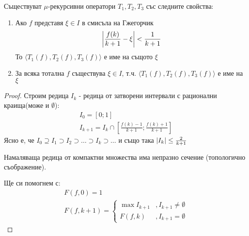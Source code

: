 \begin{lemma}[ретракция]
    Съществуват $\mu$-рекурсивни оператори $T_1, T_2, T_3$ със следните свойства:
    \begin{enumerate}
        \item Ако $f$ представя $\xi \in I$ в смисъла на Гжегорчик
        \begin{equation}
            \left|\frac{f(k)}{k+1} -\xi\right| < \frac{1}{k+1}
        \end{equation}
        То $\langle T_1(f), T_2(f), T_3(f)\rangle$ е име на същото $\xi$
        \item За всяка тотална $f$ съществува $\xi \in I$, т.ч. $\langle T_1(f), T_2(f), T_3(f)\rangle$ е име на $\xi$
    \end{enumerate}
\end{lemma}
\begin{proof}
    Строим редица $I_k$ - редица от затворени интервали с рационални краища(може и $\emptyset$):
    \begin{equation}
        \begin{split}
            I_0 = [0; 1] \\
            I_{k+1} = I_k \cap \left[ \frac{f(k)- 1}{k+1}; \frac{f(k) + 1}{k+1} \right]
        \end{split}
    \end{equation}
    Ясно е, че $I_0 \supseteq I_1 \supset I_2 \supset \dots \supset I_k \supset \dots$ и също така $\left|I_k\right| \leq \frac{2}{k+1}$

    Намаляваща редица от компактни множества има непразно сечение (топологично съображение).

    Ще си помогнем с:
    \begin{equation}
        \begin{split}
            F(f, 0) = 1\\
            F(f, k+1) = \begin{cases}
                \max I_{k+1} &, I_{k+1} \neq \emptyset \\
                F(f, k) &, I_{k+1} = \emptyset
            \end{cases}
        \end{split}
    \end{equation}
    

\end{proof}
